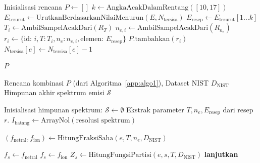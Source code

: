 \begin{onehalfspace}
\begin{algorithm}[H]
\begin{algorithmic}[1]
    \STATE {}
    \STATE Inisialisasi rencana $P \gets []$
        \STATE $k \gets \text{AngkaAcakDalamRentang}([10, 17])$
        \STATE $E_{\text{terurut}} \gets \text{UrutkanBerdasarkanNilaiMenurun}(E, N_{\text{tersisa}})$
        \STATE $E_{\text{resep}} \gets E_{\text{terurut}}[1 \dots k]$ 
        \STATE $T_i \gets \text{AmbilSampelAcakDari}(R_T)$
        \STATE $n_{e,i} \gets \text{AmbilSampelAcakDari}(R_{n_e})$
        \STATE $r_i \gets \{ \text{id: } i, T: T_i, n_e: n_{e,i}, \text{elemen: } E_{\text{resep}} \}$
        \STATE $P.\text{tambahkan}(r_i)$
            \STATE $N_{\text{tersisa}}[e] \gets N_{\text{tersisa}}[e] - 1$
        \ENDFOR
    \ENDFOR
    
    \STATE \RETURN $P$
\end{algorithmic}
\end{algorithm}

\begin{algorithm}[H]
\small
\caption{Simulasi Spektrum Berdasarkan Rencana Kombinasi}
\label{app:algo2}
\begin{algorithmic}[1]
    \REQUIRE Rencana kombinasi $P$ (dari Algoritma~\ref{app:algo1}), Dataset NIST $D_{\text{NIST}}$
    \ENSURE Himpunan akhir spektrum emisi $\mathcal{S}$
    
    \STATE Inisialisasi himpunan spektrum: $\mathcal{S} \gets \emptyset$
        \STATE Ekstrak parameter $T, n_e, E_{\text{resep}}$ dari resep $r$.
        \STATE $I_{\text{batang}} \gets \text{ArrayNol}(\text{resolusi spektrum})$ 
        
            \STATE {}
            \STATE $(f_{\text{netral}}, f_{\text{ion}}) \gets \text{HitungFraksiSaha}(e, T, n_e, D_{\text{NIST}})$
            
                    \STATE $f_s \gets f_{\text{netral}}$
                \ELSE
                    \STATE $f_s \gets f_{\text{ion}}$
                \ENDIF
                \STATE $Z_s \gets \text{HitungFungsiPartisi}(e, s, T, D_{\text{NIST}})$
                 \STATE \textbf{lanjutkan} \ENDIF
                

\end{algorithmic}
\end{algorithm}
\end{onehalfspace}

